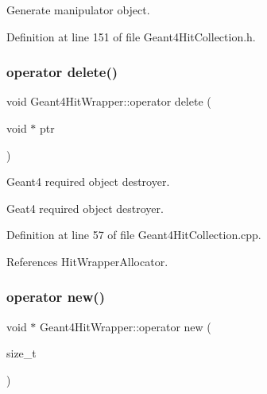Generate manipulator object. 



Definition at line 151 of file Geant4\+Hit\+Collection.\+h.

\hypertarget{class_d_d4hep_1_1_simulation_1_1_geant4_hit_wrapper_a3ca9f5bf49528ab59adaa68d2708f8c3}{}\label{class_d_d4hep_1_1_simulation_1_1_geant4_hit_wrapper_a3ca9f5bf49528ab59adaa68d2708f8c3} 
\subsubsection{\texorpdfstring{operator delete()}{operator delete()}}
{\footnotesize\ttfamily void Geant4\+Hit\+Wrapper\+::operator delete (\begin{DoxyParamCaption}\item[{void $\ast$}]{ptr }\end{DoxyParamCaption})}



Geant4 required object destroyer. 

Geat4 required object destroyer. 

Definition at line 57 of file Geant4\+Hit\+Collection.\+cpp.



References Hit\+Wrapper\+Allocator.

\hypertarget{class_d_d4hep_1_1_simulation_1_1_geant4_hit_wrapper_a645e452e2bb8c642286e323e514f0fef}{}\label{class_d_d4hep_1_1_simulation_1_1_geant4_hit_wrapper_a645e452e2bb8c642286e323e514f0fef} 
\subsubsection{\texorpdfstring{operator new()}{operator new()}}
{\footnotesize\ttfamily void $\ast$ Geant4\+Hit\+Wrapper\+::operator new (\begin{DoxyParamCaption}\item[{size\+\_\+t}]{ }\end{DoxyParamCaption})}



